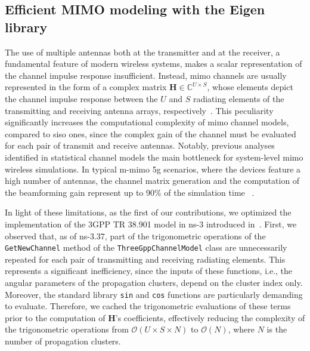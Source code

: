 
\subsection{Efficient MIMO modeling with the Eigen library}
\label{sec:opt_code}

The use of multiple antennas both at the transmitter and at the receiver, a fundamental feature of modern wireless systems, makes a scalar representation of the channel impulse response insufficient. Instead, \gls{mimo} channels are usually represented in the form of a complex matrix $\bm{H} \in \mathbb{C}^{U \times S}$, whose elements depict the channel impulse response between the $U$ and $S$ radiating elements of the transmitting and receiving antenna arrays, respectively~\cite{TR38901}. This peculiarity significantly increases the computational complexity of \gls{mimo} channel models, compared to \gls{siso} ones, since the complex gain of the channel must be evaluated for each pair of transmit and receive antennas.
Notably, previous analyses identified in statistical channel models the main bottleneck for system-level \gls{mimo} wireless simulations. In typical \gls{m-mimo} \gls{5g} scenarios, where the devices feature a high number of antennas, the channel matrix generation and the computation of the beamforming gain represent up to 90\% of the simulation time ~\cite{testolina2020scalable}. 

In light of these limitations, as the first of our contributions, we optimized the implementation of the 3GPP TR 38.901 model in ns-3 introduced in~\cite{tommaso:20}. 
First, we observed that, as of ns-3.37, part of the trigonometric operations  of the \texttt{GetNewChannel} method of the \texttt{Three\-Gpp\-Channel\-Model} class are unnecessarily repeated for each pair of transmitting and receiving radiating elements. This represents a significant inefficiency, since the inputs of these functions, i.e., the angular parameters of the propagation clusters, depend on the cluster index only. Moreover, the standard library \texttt{sin} and \texttt{cos} functions are particularly demanding to evaluate. Therefore, we cached the trigonometric evaluations of these terms prior to the computation of $\bm{H}$'s coefficients, effectively reducing the complexity of the trigonometric operations from $\mathcal{O}(U \times S \times N)$ to $\mathcal{O}(N)$, where $N$ is the number of propagation clusters. 

